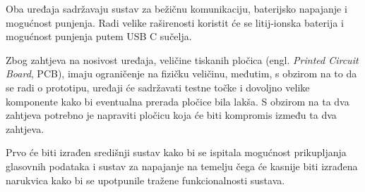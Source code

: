 Oba uređaja sadržavaju sustav za bežičnu komunikaciju, baterijsko napajanje i mogućnost punjenja. Radi velike raširenosti koristit će se litij-ionska baterija i mogućnost punjenja putem USB C sučelja.

Zbog zahtjeva na nosivost uređaja, veličine tiskanih pločica (engl. \textit{Printed Circuit Board}, PCB), imaju ograničenje na fizičku veličinu, međutim, s obzirom na to da se radi o prototipu, uređaji će sadržavati testne točke i dovoljno velike komponente kako bi eventualna prerada pločice bila lakša. S obzirom na ta dva zahtjeva potrebno je napraviti pločicu koja će biti kompromis između ta dva zahtjeva.

Prvo će biti izrađen središnji sustav kako bi se ispitala mogućnost prikupljanja glasovnih podataka i sustav za napajanje na temelju čega će kasnije biti izrađena narukvica kako bi se upotpunile tražene funkcionalnosti sustava.